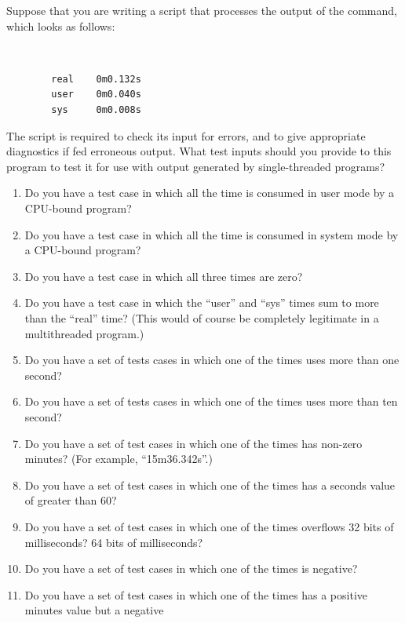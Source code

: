 \begin{enumerate}
\QuickQ{}
	Suppose that you are writing a script that processes the
	output of the  command, which looks as follows:

	\vspace{5pt}
	\begin{minipage}[t]{\columnwidth}
	\tt
	\scriptsize
	\begin{verbatim}
		real    0m0.132s
		user    0m0.040s
		sys     0m0.008s
	\end{verbatim}
	\end{minipage}
	\vspace{5pt}

	The script is required to check its input for errors, and to
	give appropriate diagnostics if fed erroneous  output.
	What test inputs should you provide to this program to test it
	for use with  output generated by single-threaded programs?
\QuickA{}
	\begin{enumerate}
	\item	Do you have a test case in which all the time is
		consumed in user mode by a CPU-bound program?
	\item	Do you have a test case in which all the time is
		consumed in system mode by a CPU-bound program?
	\item	Do you have a test case in which all three times
		are zero?
	\item	Do you have a test case in which the ``user'' and ``sys''
		times sum to more than the ``real'' time?
		(This would of course be completely legitimate in
		a multithreaded program.)
	\item	Do you have a set of tests cases in which one of the
		times uses more than one second?
	\item	Do you have a set of tests cases in which one of the
		times uses more than ten second?
	\item	Do you have a set of test cases in which one of the
		times has non-zero minutes?  (For example, ``15m36.342s''.)
	\item	Do you have a set of test cases in which one of the
		times has a seconds value of greater than 60?
	\item	Do you have a set of test cases in which one of the
		times overflows 32 bits of milliseconds?  64 bits of
		milliseconds?
	\item	Do you have a set of test cases in which one of the
		times is negative?
	\item	Do you have a set of test cases in which one of the
		times has a positive minutes value but a negative

\end{enumerate}
\end{enumerate}
